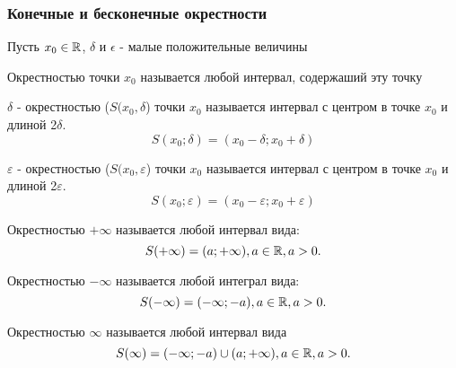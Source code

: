 \subsubsection{Конечные и бесконечные окрестности}

Пусть $x_0\in \mathbb{R}$, $\delta$ и $\epsilon$ - малые положительные величины

\begin{definition}
  Окрестностью точки $x_0$ называется любой интервал, содержаший эту точку
\end{definition}

\begin{definition}
  $\delta$ - окрестностью ($S(x_0, \delta$) точки $x_0$ называется интервал с центром в точке $x_0$ и длиной 2$\delta$.
  \[
  S(x_0; \delta) = (x_0 - \delta; x_0 + \delta)
  \] 
\end{definition}

\begin{definition}
  $\varepsilon$ - окрестностью ($S(x_0, \varepsilon$) точки $x_0$ называется интервал с центром в точке $x_0$ и длиной 2$\varepsilon$.
  \[
  S(x_0; \varepsilon) = (x_0 - \varepsilon; x_0 + \varepsilon)
  \] 
\end{definition}

\begin{definition}
  Окрестностью $+\infty$ называется любой интервал вида:
  \[
  S(+\infty) = (a; +\infty), a\in \mathbb{R}, a > 0
  .\] 
\end{definition}

\begin{definition}
  Окрестностью $-\infty$ называется любой интеграл вида:
  \[
  S(-\infty) = (-\infty; -a), a\in \mathbb{R}, a > 0
  .\] 
\end{definition}

\begin{definition}
  Окрестностью $\infty$ называется любой интервал вида
  \[
  S(\infty) = (-\infty; -a) \cup (a; +\infty), a\in \mathbb{R}, a > 0
  .\] 
\end{definition}

